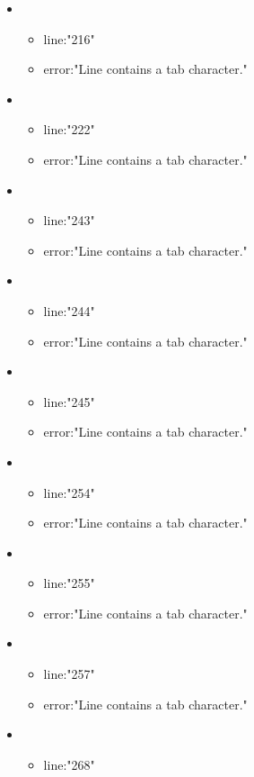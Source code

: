 \begin{itemize}
	\item 
	\begin{itemize} 
		\item line:"216" 
		\item error:"Line contains a tab character." 
	\end{itemize}
	\item 
	\begin{itemize} 
		\item line:"222" 
		\item error:"Line contains a tab character." 
	\end{itemize}
	\item 
	\begin{itemize} 
		\item line:"243" 
		\item error:"Line contains a tab character." 
	\end{itemize}
	\item 
	\begin{itemize} 
		\item line:"244" 
		\item error:"Line contains a tab character." 
	\end{itemize}
	\item 
	\begin{itemize} 
		\item line:"245" 
		\item error:"Line contains a tab character." 
	\end{itemize}
	\item 
	\begin{itemize} 
		\item line:"254" 
		\item error:"Line contains a tab character." 
	\end{itemize}
	\item 
	\begin{itemize} 
		\item line:"255" 
		\item error:"Line contains a tab character." 
	\end{itemize}
	\item 
	\begin{itemize} 
		\item line:"257" 
		\item error:"Line contains a tab character." 
	\end{itemize}
	\item 
	\begin{itemize} 
		\item line:"268" 

\end{itemize}
\end{itemize}
